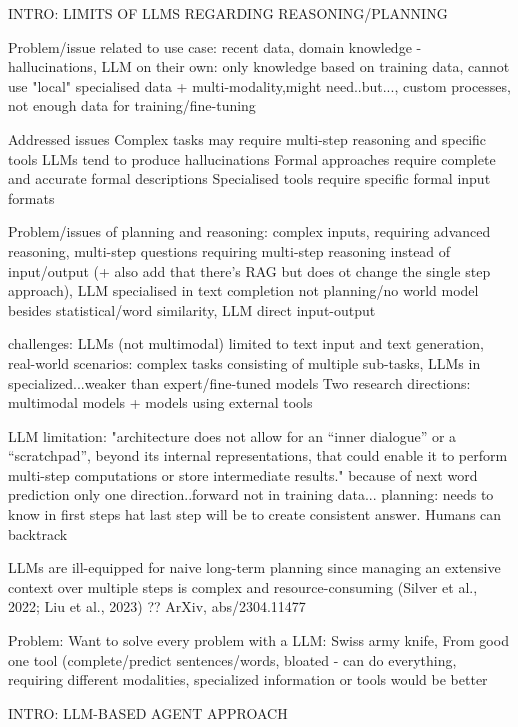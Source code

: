 \documentclass{article}
\begin{document}
INTRO: LIMITS OF LLMS REGARDING REASONING/PLANNING

Problem/issue related to use case: recent data, domain knowledge - hallucinations, LLM on their own: only knowledge based on training data, cannot use "local" specialised data
+ multi-modality,might need..but..., custom processes, not enough data for training/fine-tuning

Addressed issues
Complex tasks may require multi-step reasoning and specific tools
LLMs tend to produce hallucinations
Formal approaches require complete and accurate formal descriptions
Specialised tools require specific formal input formats 

Problem/issues of planning and reasoning: complex inputs, requiring advanced reasoning, multi-step questions requiring multi-step reasoning instead of input/output (+ also add that there's RAG but does ot change the single step approach), LLM specialised in text completion not planning/no world model besides statistical/word similarity, LLM direct input-output

\cite{shen_hugginggpt_2023} challenges: LLMs (not multimodal)  limited to text input and text generation, real-world scenarios: complex tasks consisting of multiple sub-tasks, LLMs in specialized...weaker than expert/fine-tuned models
Two research directions: multimodal models + models using external tools

\cite{bubeck_sparks_2023} LLM limitation: "architecture does not allow for an “inner dialogue” or a “scratchpad”, beyond its internal representations, that could enable it to perform multi-step computations or store intermediate results." because of next word prediction only one direction..forward not in training data...
planning: needs to know in first steps hat last step will be to create consistent answer. Humans can backtrack

LLMs are ill-equipped for naive long-term planning since managing an extensive context over multiple steps is complex and resource-consuming (Silver et al., 2022; Liu et al., 2023) \cite{silver_generalized_2023}?? ArXiv, abs/2304.11477 \cite{liu_llmp_2023}

Problem: Want to solve every problem with a LLM: Swiss army knife, From good one tool (complete/predict sentences/words, bloated - can do everything, requiring different modalities, specialized information or tools would be better

INTRO: LLM-BASED AGENT APPROACH
\end{document}
